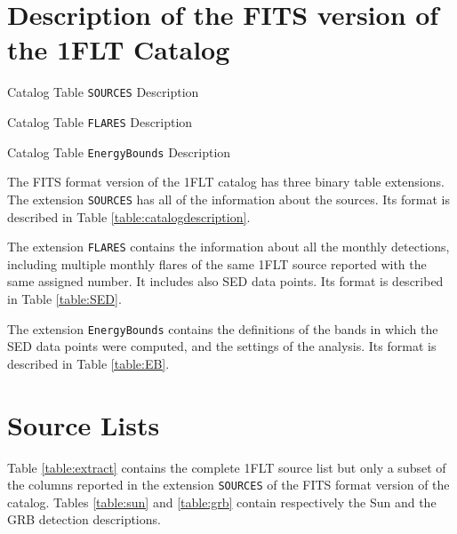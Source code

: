 \documentclass{aastex62}
\begin{document}
\clearpage
\newpage
\appendix
\setcounter{table}{0}

\section{Description of the FITS version of the 1FLT Catalog}\label{sec:catdesc}
\renewcommand{\thetable}{A\arabic{table}}

\begin{table}[hbt!]
\centering
\caption{Catalog Table \texttt{SOURCES} Description}

\end{table}\label{table:catalogdescription}

\begin{table}
\centering
\caption{Catalog Table \texttt{FLARES} Description}

\end{table}\label{table:SED}

\begin{table}
\centering
\caption{Catalog Table \texttt{EnergyBounds} Description}

\end{table}\label{table:EB}

The FITS format version of the 1FLT catalog has three binary table extensions. The extension \texttt{SOURCES} has all of the information about the sources. Its format is described in Table \ref{table:catalogdescription}.

The extension \texttt{FLARES} contains the information about all the monthly detections, including multiple monthly flares of the same 1FLT source reported with the same assigned number. It includes also SED data points. Its format is described in Table \ref{table:SED}.

The extension \texttt{EnergyBounds} contains the definitions of the bands in which the SED data points were computed, and the settings
of the analysis. Its format is described in Table \ref{table:EB}. 



\section{Source Lists}\label{sec:srclist}
\setcounter{table}{0}
\renewcommand{\thetable}{B\arabic{table}}
Table \ref{table:extract} contains the complete 1FLT source list but only a subset of the columns reported in the extension \texttt{SOURCES} of the FITS format version of the catalog. Tables \ref{table:sun} and \ref{table:grb} contain respectively the Sun and the GRB detection descriptions. 
\end{document}
